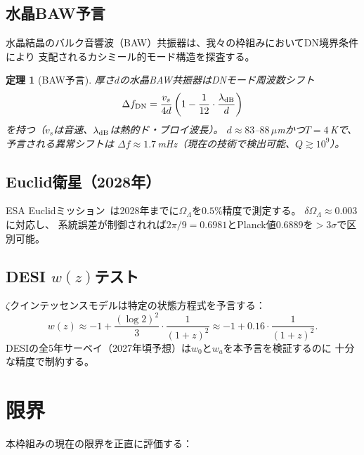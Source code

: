 \documentclass[12pt,a4paper]{article}
\newtheorem{theorem}{定理}[section]
\theoremstyle{definition}
\newcommand{\OmL}{\Omega_\Lambda}
\begin{document}
\subsection{水晶BAW予言}

水晶結晶のバルク音響波（BAW）共振器は、我々の枠組みにおいてDN境界条件により
支配されるカシミール的モード構造を探査する。

\begin{theorem}[BAW予言]\label{thm:baw}
厚さ$d$の水晶BAW共振器はDNモード周波数シフト
\[
  \Delta f_{\rm DN}=\frac{v_s}{4d}\left(1-\frac{1}{12}\cdot\frac{\lambda_{\rm dB}}{d}\right)
\]
を持つ（$v_s$は音速、$\lambda_{\rm dB}$は熱的ド・ブロイ波長）。
$d\approx 83$--$88\,\mu$mかつ$T=4\,$Kで、予言される異常シフトは
$\Delta f\approx 1.7\,$mHz（現在の技術で検出可能、$Q\gtrsim 10^9$）。
\end{theorem}

\subsection{Euclid衛星（2028年）}

ESA Euclidミッション~\cite{Euclid}は2028年までに$\OmL$を$0.5\%$精度で測定する。
$\delta\OmL\approx 0.003$に対応し、
系統誤差が制御されれば$2\pi/9=0.6981$とPlanck値$0.6889$を$>3\sigma$で区別可能。

\subsection{DESI $w(z)$テスト}

$\zeta$クインテッセンスモデルは特定の状態方程式を予言する：
\[
  w(z)\approx -1+\frac{(\log 2)^2}{3}\cdot\frac{1}{(1+z)^2}
  \approx -1+0.16\cdot\frac{1}{(1+z)^2}.
\]
DESIの全5年サーベイ（2027年頃予想）は$w_0$と$w_a$を本予言を検証するのに
十分な精度で制約する。

\section{限界}\label{sec:limits}

本枠組みの現在の限界を正直に評価する：
\end{document}
